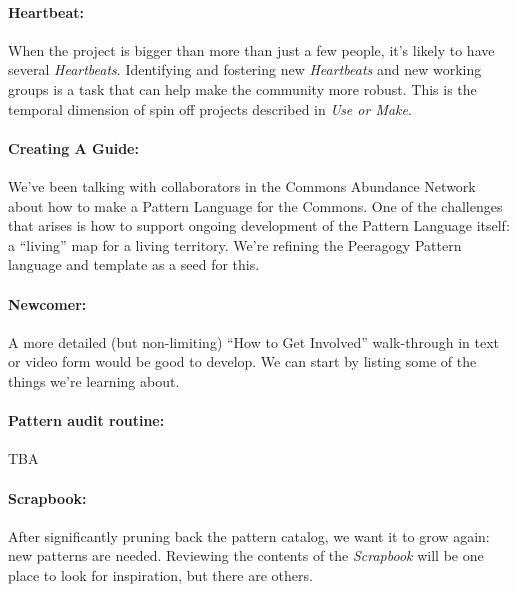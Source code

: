 \paragraph{Heartbeat:} When the project is bigger than more than just a few people, it's likely to have several \emph{Heartbeats}.  Identifying and fostering new \emph{Heartbeats} and new working groups is a task that can help make the community more robust.  This is the temporal dimension of spin off projects described in \emph{Use or Make}.

\paragraph{Creating A Guide:} We’ve been talking with collaborators in the Commons Abundance Network
about how to make a Pattern Language for the Commons. One of the
challenges that arises is how to support ongoing development of the
Pattern Language itself: a “living” map for a living territory. We’re
refining the Peeragogy Pattern language and template as a seed for this.

\paragraph{Newcomer:} A more detailed (but non-limiting) ``How to Get Involved'' walk-through in text or video form would be good to develop. We can start by listing some of the things we're learning about.

\paragraph{Pattern audit routine:}  TBA

\paragraph{Scrapbook:} After significantly pruning back the pattern catalog, we want it to grow again: new patterns are needed.  Reviewing the contents of the \emph{Scrapbook} will be one place to look for inspiration, but there are others.



